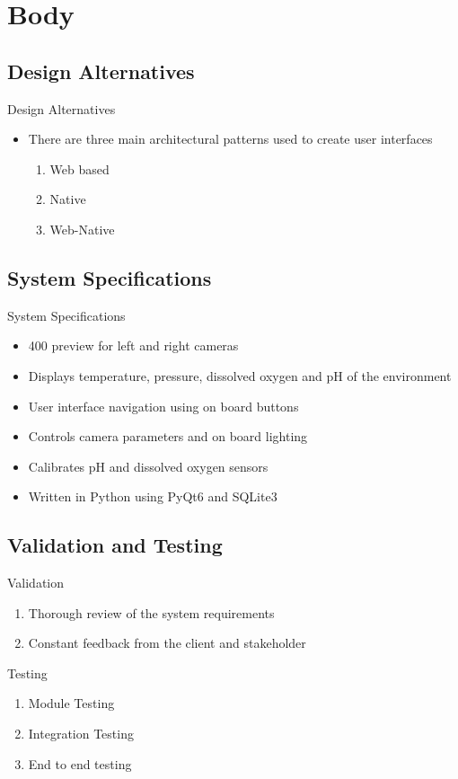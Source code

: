 \documentclass[17pt, aspectratio=169]{beamer}
\begin{document}
\section{Body}
\subsection*{Design Alternatives}
\begin{frame}{Design Alternatives}
	\begin{itemize}

		\item There are three main architectural patterns used to create user interfaces
		      \begin{enumerate}
			      \item Web based
			      \item Native
			      \item Web-Native
		      \end{enumerate}
	\end{itemize}
\end{frame}
\subsection*{System Specifications}
\begin{frame}{System Specifications}
	\begin{itemize}
		\item 400 preview for left and right cameras
		\item Displays temperature, pressure, dissolved oxygen and pH of the environment
		\item User interface navigation using on board buttons
		\item Controls camera parameters and on board lighting
		\item Calibrates pH and dissolved oxygen sensors
		\item Written in Python using PyQt6 and SQLite3
	\end{itemize}
\end{frame}
\subsection*{Validation and Testing}
\begin{frame}{Validation}
	\begin{enumerate}
		\item Thorough review of the system requirements
		\item Constant feedback from the client and stakeholder
	\end{enumerate}
\end{frame}
\begin{frame}{Testing}
	\begin{enumerate}
		\item Module Testing
		\item Integration Testing
		\item End to end testing
	\end{enumerate}
\end{frame}
\end{document}
